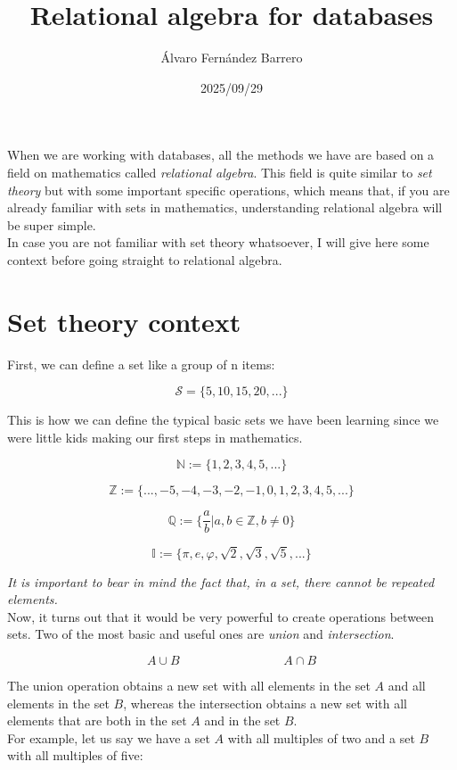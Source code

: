\documentclass[12pt]{article}
\title{Relational algebra for databases}
\author{Álvaro Fernández Barrero}
\date{2025/09/29}
\begin{document}
\maketitle

When we are working with databases, all the methods we have are based on a field on mathematics called \emph{relational algebra}. This field is quite similar to \emph{set theory} but with some important specific operations, which means that, if you are already familiar with sets in mathematics, understanding relational algebra will be super simple. \\
In case you are not familiar with set theory whatsoever, I will give here some context before going straight to relational algebra.

\section{Set theory context}

First, we can define a set like a group of n items:

\[
    \mathcal{S} = \{ 5, 10, 15, 20, ... \}
\]

This is how we can define the typical basic sets we have been learning since we were little kids making our first steps in mathematics.

\[
    \mathbb{N}:=\{1,2,3,4,5,...\}
\]

\[
    \mathbb{Z}:=\{...,-5,-4,-3,-2,-1,0,1,2,3,4,5,...\}
\]

\[
    \mathbb{Q}:=\{\frac{a}{b} | a,b \in \mathbb{Z}, b\neq0 \}
\]

\[
    \mathbb{I}:=\{\pi, e, \varphi, \sqrt{2}, \sqrt{3}, \sqrt{5},...\}
\]

\emph{It is important to bear in mind the fact that, in a set, there cannot be repeated elements.}\\
Now, it turns out that it would be very powerful to create operations between sets. Two of the most basic and useful ones are \emph{union} and \emph{intersection}.

\[
    A \cup B \;\;\;\;\;\;\;\;\;\;\;\;\;\;\;\;\;\;\;\;\;\;\;\;\;\;\;\;\;\; A \cap B
\]

The union operation obtains a new set with all elements in the set \( A \) and all elements in the set \( B \), whereas the intersection obtains a new set with all elements that are both in the set \( A \) and in the set \( B \). \\
For example, let us say we have a set \(A\) with all multiples of two and a set \(B\) with all multiples of five:
\end{document}
